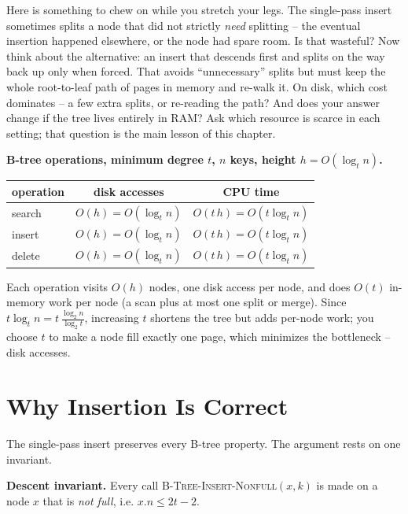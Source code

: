 \begin{walkbox}
Here is something to chew on while you stretch your legs. The single-pass insert
sometimes splits a node that did not strictly \emph{need} splitting
-- the eventual insertion happened elsewhere, or the node had spare room. Is that
wasteful? Now think about the alternative: an insert that descends first and splits
on the way back up only when forced. That avoids ``unnecessary'' splits but must
keep the whole root-to-leaf path of pages in memory and re-walk it. On disk, which
cost dominates -- a few extra splits, or re-reading the path? And does your answer
change if the tree lives entirely in RAM? Ask which resource is
scarce in each setting; that question is the main lesson of this chapter.
\end{walkbox}

\begin{complexitybox}
\textbf{B-tree operations, minimum degree $t$, $n$ keys, height $h = O(\log_t n)$.}
\begin{center}
\begin{tabular}{l c c}
\toprule
operation & disk accesses & CPU time \\
\midrule
search & $O(h) = O(\log_t n)$ & $O(t\,h) = O(t \log_t n)$ \\
insert & $O(h) = O(\log_t n)$ & $O(t\,h) = O(t \log_t n)$ \\
delete & $O(h) = O(\log_t n)$ & $O(t\,h) = O(t \log_t n)$ \\
\bottomrule
\end{tabular}
\end{center}
Each operation visits $O(h)$ nodes, one disk access per node, and does $O(t)$
in-memory work per node (a scan plus at most one split or merge). Since
$t\log_t n = t\,\frac{\log_2 n}{\log_2 t}$, increasing $t$ shortens the tree but
adds per-node work; you choose $t$ to make a node fill exactly one page, which
minimizes the bottleneck -- disk accesses.
\end{complexitybox}

\section{Why Insertion Is Correct}

The single-pass insert preserves every B-tree property. The argument rests on one invariant.

\begin{formalbox}
\textbf{Descent invariant.} Every call \textsc{B-Tree-Insert-Nonfull}$(x,k)$ is
made on a node $x$ that is \emph{not full}, i.e. $x.n \le 2t-2$.
\end{formalbox}

